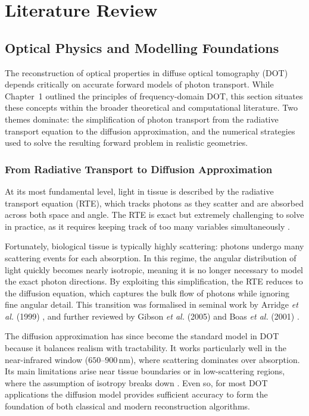 \chapter{Literature Review}

\section{Optical Physics and Modelling Foundations}
The reconstruction of optical properties in diffuse optical tomography (DOT) depends critically on accurate forward models of photon transport. While Chapter~1 outlined the principles of frequency-domain DOT, this section situates these concepts within the broader theoretical and computational literature. Two themes dominate: the simplification of photon transport from the radiative transport equation to the diffusion approximation, and the numerical strategies used to solve the resulting forward problem in realistic geometries.

\subsection{From Radiative Transport to Diffusion Approximation}
At its most fundamental level, light in tissue is described by the radiative transport equation (RTE), which tracks photons as they scatter and are absorbed across both space and angle. The RTE is exact but extremely challenging to solve in practice, as it requires keeping track of too many variables simultaneously \cite{arridge1999}. 

Fortunately, biological tissue is typically highly scattering: photons undergo many scattering events for each absorption. In this regime, the angular distribution of light quickly becomes nearly isotropic, meaning it is no longer necessary to model the exact photon directions. By exploiting this simplification, the RTE reduces to the diffusion equation, which captures the bulk flow of photons while ignoring fine angular detail. This transition was formalised in seminal work by Arridge \emph{et al.} (1999) \cite{arridge1999}, and further reviewed by Gibson \emph{et al.} (2005) \cite{gibson2005} and Boas \emph{et al.} (2001) \cite{boas2001}. 

The diffusion approximation has since become the standard model in DOT because it balances realism with tractability. It works particularly well in the near-infrared window ($650$–$900$\,nm), where scattering dominates over absorption. Its main limitations arise near tissue boundaries or in low-scattering regions, where the assumption of isotropy breaks down \cite{arridge2009}. Even so, for most DOT applications the diffusion model provides sufficient accuracy to form the foundation of both classical and modern reconstruction algorithms.

